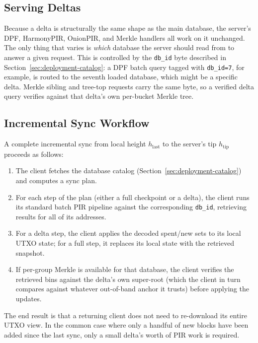 \subsection{Serving Deltas}

Because a delta is structurally the same shape as the main database, the server's DPF, HarmonyPIR, OnionPIR, and Merkle handlers all work on it unchanged. The only thing that varies is \emph{which} database the server should read from to answer a given request. This is controlled by the \texttt{db\_id} byte described in Section~\ref{sec:deployment-catalog}: a DPF batch query tagged with \texttt{db\_id=7}, for example, is routed to the seventh loaded database, which might be a specific delta. Merkle sibling and tree-top requests carry the same byte, so a verified delta query verifies against that delta's own per-bucket Merkle tree.

\subsection{Incremental Sync Workflow}

A complete incremental sync from local height $h_\text{last}$ to the server's tip $h_\text{tip}$ proceeds as follows:
\begin{enumerate}[nolistsep,leftmargin=*]
    \item The client fetches the database catalog (Section~\ref{sec:deployment-catalog}) and computes a sync plan.
    \item For each step of the plan (either a full checkpoint or a delta), the client runs its standard batch PIR pipeline against the corresponding \texttt{db\_id}, retrieving results for all of its addresses.
    \item For a delta step, the client applies the decoded spent/new sets to its local UTXO state; for a full step, it replaces its local state with the retrieved snapshot.
    \item If per-group Merkle is available for that database, the client verifies the retrieved bins against the delta's own super-root (which the client in turn compares against whatever out-of-band anchor it trusts) before applying the updates.
\end{enumerate}
The end result is that a returning client does not need to re-download its entire UTXO view. In the common case where only a handful of new blocks have been added since the last sync, only a small delta's worth of PIR work is required.
